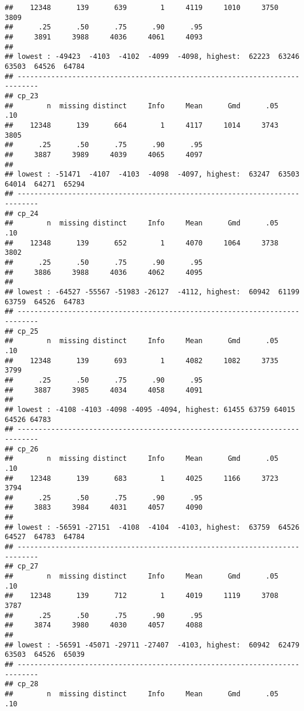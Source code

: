 \documentclass[]{article}
\begin{document}
\begin{verbatim}
##    12348      139      639        1     4119     1010     3750     3809 
##      .25      .50      .75      .90      .95 
##     3891     3988     4036     4061     4093 
## 
## lowest : -49423  -4103  -4102  -4099  -4098, highest:  62223  63246  63503  64526  64784
## ---------------------------------------------------------------------------
## cp_23 
##        n  missing distinct     Info     Mean      Gmd      .05      .10 
##    12348      139      664        1     4117     1014     3743     3805 
##      .25      .50      .75      .90      .95 
##     3887     3989     4039     4065     4097 
## 
## lowest : -51471  -4107  -4103  -4098  -4097, highest:  63247  63503  64014  64271  65294
## ---------------------------------------------------------------------------
## cp_24 
##        n  missing distinct     Info     Mean      Gmd      .05      .10 
##    12348      139      652        1     4070     1064     3738     3802 
##      .25      .50      .75      .90      .95 
##     3886     3988     4036     4062     4095 
## 
## lowest : -64527 -55567 -51983 -26127  -4112, highest:  60942  61199  63759  64526  64783
## ---------------------------------------------------------------------------
## cp_25 
##        n  missing distinct     Info     Mean      Gmd      .05      .10 
##    12348      139      693        1     4082     1082     3735     3799 
##      .25      .50      .75      .90      .95 
##     3887     3985     4034     4058     4091 
## 
## lowest : -4108 -4103 -4098 -4095 -4094, highest: 61455 63759 64015 64526 64783
## ---------------------------------------------------------------------------
## cp_26 
##        n  missing distinct     Info     Mean      Gmd      .05      .10 
##    12348      139      683        1     4025     1166     3723     3794 
##      .25      .50      .75      .90      .95 
##     3883     3984     4031     4057     4090 
## 
## lowest : -56591 -27151  -4108  -4104  -4103, highest:  63759  64526  64527  64783  64784
## ---------------------------------------------------------------------------
## cp_27 
##        n  missing distinct     Info     Mean      Gmd      .05      .10 
##    12348      139      712        1     4019     1119     3708     3787 
##      .25      .50      .75      .90      .95 
##     3874     3980     4030     4057     4088 
## 
## lowest : -56591 -45071 -29711 -27407  -4103, highest:  60942  62479  63503  64526  65039
## ---------------------------------------------------------------------------
## cp_28 
##        n  missing distinct     Info     Mean      Gmd      .05      .10 

\end{verbatim}
\end{document}
